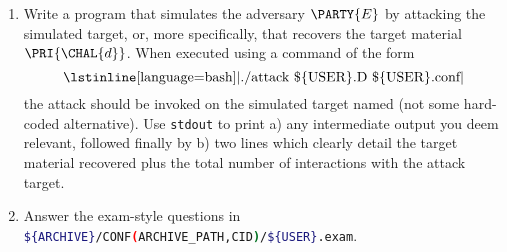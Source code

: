 

\begin{enumerate}
\item Write a program that simulates the adversary $\PARTY{E}$ by attacking
      the simulated target, or, more specifically, that recovers the target 
      material $\PRI{\CHAL{d}}$.  
      When executed using a command of the form
      \[
      \mbox{\lstinline[language={bash}]|./attack \$\{USER\}.D \$\{USER\}.conf|}
      \]
      the attack should be invoked on the simulated target named (not some
      hard-coded alternative).  Use \lstinline[language={bash}]{stdout} to 
      print 
      a) any intermediate output you deem relevant, followed finally by 
      b) two lines which clearly detail the target material recovered plus
         the total number of interactions with the attack target.
\item Answer the exam-style questions in 
      \lstinline[language={bash}]|${ARCHIVE}/CONF(ARCHIVE_PATH,CID)/${USER}.exam|.
\end{enumerate}

